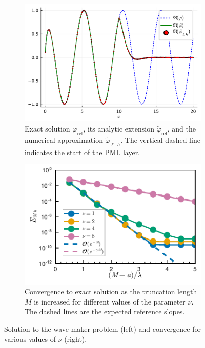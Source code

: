 \documentclass[review,hidelinks,onefignum,onetabnum]{siamart220329}
\newcommand{\tvarphi}{\widetilde \varphi}
\begin{document}
\begin{figure}[ht]
  \centering
  \begin{subfigure}[t]{0.49\linewidth}
    \includegraphics[width=1\textwidth]{wavemaker_modal_solution.pdf}
    \caption{Exact solution $\varphi_{\text{ref}}$, its analytic extension
    $\tvarphi_{\text{ref}}$, and the numerical approximation $\tvarphi_{\ell,h}$. The vertical dashed line indicates the start of the PML layer.}
    \label{fig:wavemaker-comparison-exact-numerical}
  \end{subfigure}\hfill
  \begin{subfigure}[t]{0.49\linewidth}
    \includegraphics[width=1\textwidth]{convergence_pml_planewave_vary_depth.pdf}
    \caption{Convergence to exact solution as the truncation length $M$ is increased for different values of the parameter $\nu$. The dashed lines are the expected reference slopes.}
    \label{fig:convergence-wavemaker}
  \end{subfigure}
  \caption{Solution to the wave-maker problem (left) and convergence for various values of $\nu$ (right).}
\end{figure}
\end{document}
